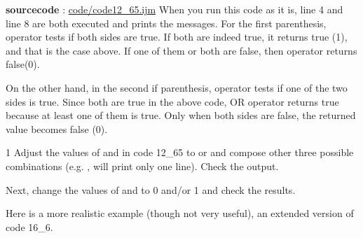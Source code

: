 \textbf{sourcecode} : \href{http://www.example.com/contents}{code/code12\_65.ijm}
When you run this code as it is, line 4 and line 8 are both executed and prints
the messages. For the first  parenthesis, \ilcom{\&\&} operator tests if
both sides are true. If both are indeed true, it returns true (1), and that is
the case above. If one of them or both are false, then \ilcom{\&\&}
operator returns false(0).

On the other hand, in the second if parenthesis,
\ilcom{||} operator tests if one of the two sides is true. Since both are
true in the above code, OR operator returns true because at least one of them is
true. Only when both sides are false, the returned value becomes false (0).

\begin{indentexercise}
{1}
Adjust the values of  and  in code 12\_65 to  or  and
compose other three possible combinations (e.g. ,  will print
only one line). Check the output.

Next, change the values of  and  to 0 and/or
1 and check the results. 

\end{indentexercise}

Here is a more realistic example (though not very useful), an extended version
of code 16\_6.